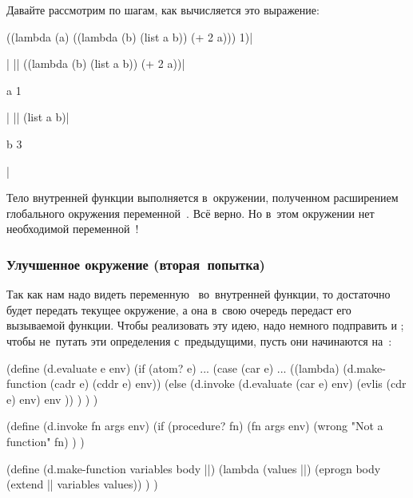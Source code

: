 Давайте рассмотрим по шагам, как вычисляется это выражение:

\begin{code:lisp}
((lambda (a) ((lambda (b) (list a b)) (+ 2 a))) 1)|\begin{where}
                                                   \- 
                                                   \end{where}|
|\equals| ((lambda (b) (list a b)) (+ 2 a))|\begin{where}
                                            \- a {\is} 1
                                            \- 
                                            \end{where}|
|\equals| (list a b)|\begin{where}
                     \- b {\is} 3
                     \- 
                     \end{where}|
\end{code:lisp}

Тело внутренней функции  выполняется в~окружении,
полученном расширением глобального окружения переменной~. Всё верно. Но
в~этом окружении нет необходимой переменной~!


\subsubsection{Улучшенное окружение (вторая~попытка)}

Так как нам надо видеть переменную~ во~внутренней функции, то достаточно
будет передать  текущее окружение, а она в~свою очередь передаст его
вызываемой функции. Чтобы реализовать эту идею, надо немного подправить
 и ; чтобы не~путать эти определения с~предыдущими,
пусть они начинаются на~:

\begin{code:lisp}
(define (d.evaluate e env)
  (if (atom? e) ...
      (case (car e)
        ...
        ((lambda) (d.make-function (cadr e) (cddr e) env))
        (else     (d.invoke (d.evaluate (car e) env)
                            (evlis (cdr e) env)
                            env )) ) ) )

(define (d.invoke fn args env)
  (if (procedure? fn)
      (fn args env)
      (wrong "Not a function" fn) ) )

(define (d.make-function variables body ||)
  (lambda (values ||)
    (eprogn body (extend || variables values)) ) )
\end{code:lisp}

